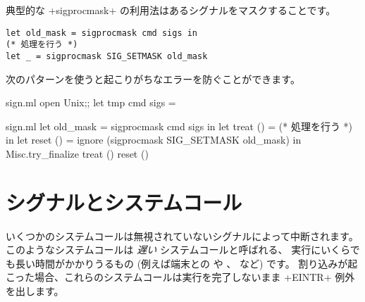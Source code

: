 %
典型的な \ml+sigprocmask+ の利用法はあるシグナルをマスクすることです。
%
\begin{lstlisting}
let old_mask = sigprocmask cmd sigs in
(* 処理を行う *)
let _ = sigprocmask SIG_SETMASK old_mask
\end{lstlisting}
%
次のパターンを使うと起こりがちなエラーを防ぐことができます。
%
\begin{codefile}{sign.ml}
open Unix;;
let tmp cmd sigs =
\end{codefile}
%
\begin{listingcodefile}{sign.ml}
let old_mask = sigprocmask cmd sigs in
let treat () = (* 処理を行う *) in
let reset () = ignore (sigprocmask SIG_SETMASK old_mask) in
Misc.try_finalize treat () reset ()
\end{listingcodefile}

\section{\label{sec/sigsyscalls}シグナルとシステムコール}

いくつかのシステムコールは無視されていないシグナルによって中断されます。
このようなシステムコールは \emph{遅い} システムコールと呼ばれる、
実行にいくらでも長い時間がかかりうるもの (例えば端末との \io や 、  など) です。
割り込みが起こった場合、これらのシステムコールは実行を完了しないまま \ml+EINTR+ 例外を出します。

